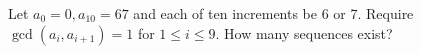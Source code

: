 Let $a_0=0,a_{10}=67$ and each of ten increments be 6 or 7. Require $\gcd(a_i,a_{i+1})=1$ for $1\le i\le9$. How many sequences exist?
